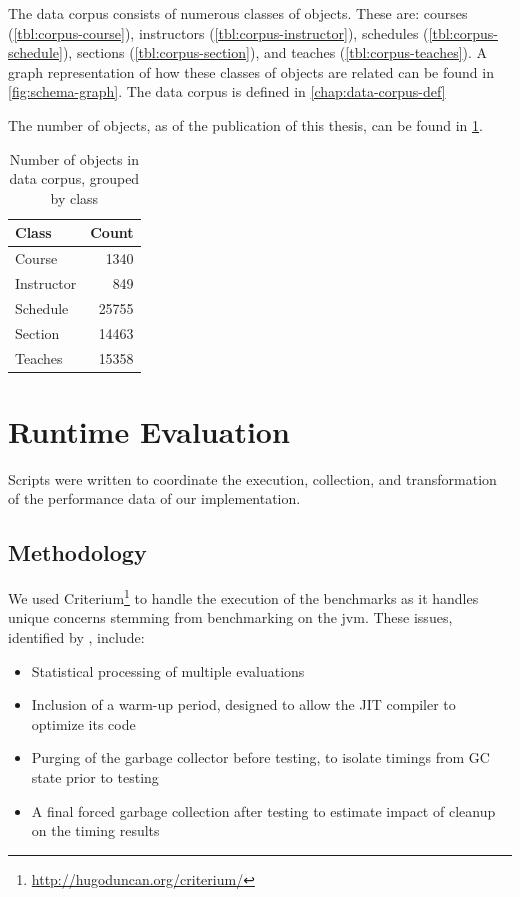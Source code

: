 		The data corpus consists of numerous classes of objects.  These are:  courses (\cref{tbl:corpus-course}), instructors (\cref{tbl:corpus-instructor}), schedules (\cref{tbl:corpus-schedule}), sections (\cref{tbl:corpus-section}), and teaches (\cref{tbl:corpus-teaches}).  A graph representation of how these classes of objects are related can be found in \cref{fig:schema-graph}.  The data corpus is defined in \cref{chap:data-corpus-def}
		
		The number of objects, as of the publication of this thesis, can be found in \cref{tbl:data-corpus-count}.
		
		\begin{table}
			\centering
			\begin{tabular}{lr}
			\toprule
			Class & Count \\
			\midrule
			Course & 1340 \\
			Instructor & 849 \\
			Schedule & 25755 \\
			Section & 14463 \\
			Teaches & 15358 \\
			\bottomrule
			\end{tabular}
			
			\caption{Number of objects in data corpus, grouped by class}
			\label{tbl:data-corpus-count}
		\end{table}
	
	\section{Runtime Evaluation}
	\label{sec:runtime-evaluation}
		Scripts were written to coordinate the execution, collection, and transformation of the performance data of our implementation.
		
		\subsection{Methodology}
			We used Criterium\footnote{\url{http://hugoduncan.org/criterium/}} to handle the execution of the benchmarks as it handles unique concerns stemming from benchmarking on the \gls{jvm}.  These issues, identified by \citeauthor{rob-java-bench-08} \cite{rob-java-bench-08}, include:
			
			\begin{itemize}
				\item Statistical processing of multiple evaluations
				\item Inclusion of a warm-up period, designed to allow the JIT compiler to optimize its code
				\item Purging of the garbage collector before testing, to isolate timings from GC state prior to testing
				\item A final forced garbage collection after testing to estimate impact of cleanup on the timing results
			\end{itemize}
		
